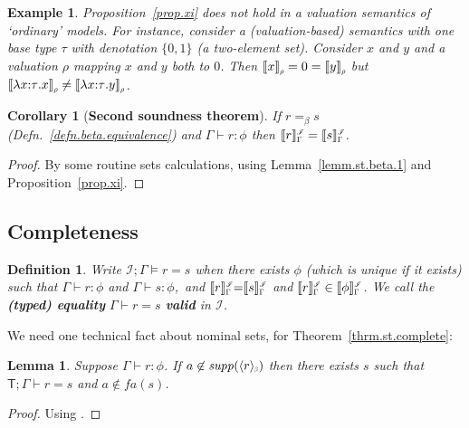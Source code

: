 \documentclass[submission,copyright]{eptcs}
\newtheorem{lemm}[thrm]{Lemma}
\newtheorem{corr}[thrm]{Corollary}
\newtheorem{defn}[thrm]{Definition}
\newtheorem{xmpl}[thrm]{Example}
\newcommand{\beq}{=_{\scriptstyle{\beta}}}
\newcommand{\deffont}[1]{\textbf{#1}}
\newcommand{\f}[1]{\ensuremath{\text{$\mathit{#1}$}}}
\newcommand{\lam}[1]{\lambda{#1}.}
\newcommand{\beeq}[1]{\ensuremath{\langle #1 \rangle_{\scalebox{.5}{\hspace{-.2ex}$\beta$}}}} \newcommand{\model}[1]{\ensuremath{\llbracket #1 \rrbracket}}
\newcommand{\supp}{\f{supp}}
\newcommand{\theory}[1]{\ensuremath{\mathsf{#1}}}
\newcommand{\fa}{\f{fa}}
\newcommand\den[1]{{\hspace{.00ex}\scalebox{.55}{$#1$}}}
\newcommand{\idenot}[2]{\denot{\interp I}{#1}{#2}}
\newcommand\interp[1]{\ensuremath{\mathscr #1}}
\newcommand{\denot}[3]{\llbracket #3 \rrbracket_{\scalebox{.6}{$#2$}}^\den{#1}} \newcommand{\hdenot}[1]{\denot{\interp H}{}{#1}}
\newcommand\cent{\vdash}
\newcommand\ment{\vDash}
\begin{document}
\begin{xmpl}
\label{xmpl.two.point}
Proposition~\ref{prop.xi} does not hold in a valuation semantics of `ordinary' models.
For instance, consider a (valuation-based) semantics with one base type $\tau$ with denotation $\{0,1\}$ (a two-element set).
Consider $x$ and $y$ and a valuation $\rho$ mapping $x$ and $y$ both to $0$.
Then $\denot{}{\rho}{x}=0=\denot{}{\rho}{y}$ but $\denot{}{\rho}{\lam{x{:}\tau}x}\neq\denot{}{\rho}{\lam{x{:}\tau}y}$.
\end{xmpl}





\begin{corr}[\bf Second soundness theorem]
If $r\beq s$ (Defn.~\ref{defn.beta.equivalence}) and $\Gamma\cent r:\phi$ then $\idenot{\Gamma}{r}=\idenot{\Gamma}{s}$.
\end{corr}
\begin{proof}
By some routine sets calculations, using Lemma~\ref{lemm.st.beta.1} and Proposition~\ref{prop.xi}.
\end{proof}
 


\subsection{Completeness}
\label{subsect.completeness}

\begin{defn}
\label{defn.ment}
Write $\interp I;\Gamma\ment r{=}s$ when there exists $\phi$ (which is unique if it exists) such that $\Gamma\cent r{:}\phi$ and $\Gamma\cent s{:}\phi$,\ and $\idenot{\Gamma}{r}{=}\idenot{\Gamma}{s}$ and $\idenot{\Gamma}{r}\in\idenot{\Gamma}{\phi}$. 
We call the \deffont{(typed) equality} $\Gamma\cent r{=}s$ \deffont{valid} in $\interp I$.
\end{defn}



We need one technical fact about nominal sets, for Theorem~\ref{thrm.st.complete}: 
\begin{lemm}
\label{lemm.beeq.fresh.rep}
Suppose $\Gamma\cent r:\phi$.
If $a\not\in\supp(\beeq{r})$ then there exists $s$ such that $\theory T;\Gamma\cent r=s$ and $a\not\in\fa(s)$.
\end{lemm}
\begin{proof}
Using \cite[Lemma~7.6.2]{gabbay:nomtnl}.
\end{proof}
\end{document}
